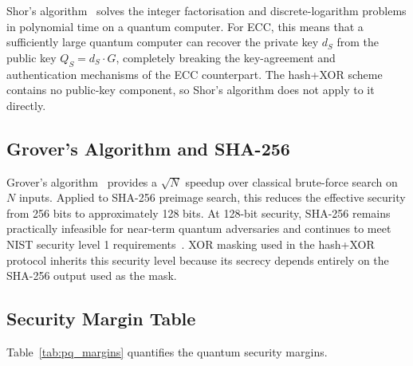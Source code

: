 \documentclass[journal]{IEEEtran}
\begin{document}
Shor's algorithm~\cite{Shor1997} solves the integer factorisation and
discrete-logarithm problems in polynomial time on a quantum computer. For
ECC, this means that a sufficiently large quantum computer can recover the
private key $d_S$ from the public key $Q_S = d_S \cdot G$, completely
breaking the key-agreement and authentication mechanisms of the ECC
counterpart. The hash+XOR scheme contains no public-key component, so Shor's
algorithm does not apply to it directly.

\subsection{Grover's Algorithm and SHA-256}

Grover's algorithm~\cite{Grover1996} provides a $\sqrt{N}$ speedup over
classical brute-force search on $N$ inputs. Applied to SHA-256 preimage
search, this reduces the effective security from 256 bits to approximately
128 bits. At 128-bit security, SHA-256 remains practically infeasible for
near-term quantum adversaries and continues to meet NIST security level 1
requirements~\cite{NISTFIPS1804}. XOR masking used in the hash+XOR protocol
inherits this security level because its secrecy depends entirely on the
SHA-256 output used as the mask.

\subsection{Security Margin Table}

Table~\ref{tab:pq_margins} quantifies the quantum security margins.

\begin{table}[!t]
\caption{Post-Quantum Security Margins by Primitive}
\label{tab:pq_margins}
\centering
\small
{}
\end{table}
\end{document}
